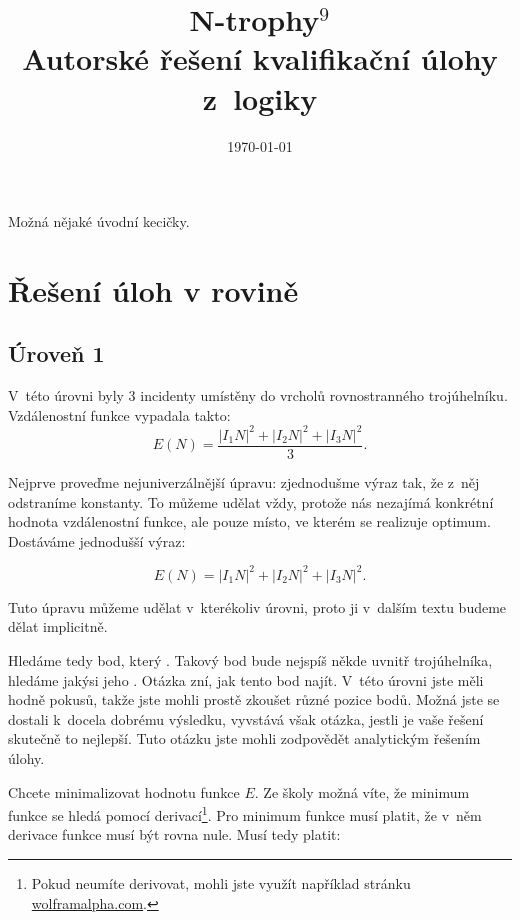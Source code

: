 \documentclass[12pt,a4paper]{article}
\begin{document}
\pagestyle{fancy}     %
\setcounter{page}{1}  %

\fancyhead[R]{}

\title{N-trophy$^9$\\Autorské řešení kvalifikační úlohy z~logiky}
\date{\today}
\maketitle

\setlength{\parindent}{0cm}
\setlength{\parskip}{3mm plus2pt minus2pt}

Možná nějaké úvodní kecičky.

\section*{Řešení úloh v rovině}
\subsection*{Úroveň 1}

V~této úrovni byly 3 incidenty umístěny do vrcholů rovnostranného trojúhelníku.
Vzdálenostní funkce vypadala takto:
$$E(N) = \frac{|I_1N|^2 + |I_2N|^2 + |I_3N|^2}{3}.$$

Nejprve proveďme nejuniverzálnější úpravu: zjednodušme výraz tak, že z~něj
odstraníme konstanty. To můžeme udělat vždy, protože nás nezajímá konkrétní
hodnota vzdálenostní funkce, ale pouze místo, ve kterém se realizuje optimum.
Dostáváme jednodušší výraz:

$$E(N) = |I_1N|^2 + |I_2N|^2 + |I_3N|^2.$$

Tuto úpravu můžeme udělat v~kterékoliv úrovni, proto ji v~dalším textu budeme
dělat implicitně.

Hledáme tedy bod, který . Takový bod bude
nejspíš někde uvnitř trojúhelníka, hledáme jakýsi jeho . Otázka zní,
jak tento bod najít. V~této úrovni jste měli hodně pokusů, takže jste mohli
prostě zkoušet různé pozice bodů. Možná jste se dostali k~docela dobrému
výsledku, vyvstává však otázka, jestli je vaše řešení skutečně to nejlepší.
Tuto otázku jste mohli zodpovědět analytickým řešením úlohy.

Chcete minimalizovat hodnotu funkce $E$. Ze školy možná víte, že minimum
funkce se hledá pomocí derivací\footnote{Pokud neumíte derivovat, mohli jste
využít například stránku \url{wolframalpha.com}.}. Pro minimum funkce musí
platit, že v~něm derivace funkce musí být rovna nule. Musí tedy platit:
\end{document}
